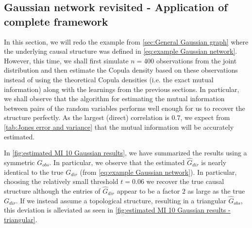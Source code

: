 \documentclass[../Thesis.tex]{subfiles}
\begin{document}



\newpage



\subsection{Gaussian network revisited - Application of complete framework}\label{sec:Gaussian network MI example - computation}
In this section, we will redo the example from \autoref{sec:General Gaussian graph} where the underlying causal structure was defined in \autoref{eq:example Gaussian network}. However, this time, we shall first simulate $n = 400$ observations from the joint distribution and then estimate the Copula density based on these observations instead of using the theoretical Copula densities (i.e. the exact mutual information) along with the learnings from the previous sections. In particular, we shall observe that the algorithm for estimating the mutual information between pairs of the random variables performs well enough for us to recover the structure perfectly. As the largest (direct) correlation is $0.7$, we expect from \autoref{tab:Jones error and variance} that the mutual information will be accurately estimated.







In \autoref{fig:estimated MI 10 Gaussian results}, we have summarized the results using a symmetric $G_{obs}$. In particular, we observe that the estimated $\hat{G}_{dir}$ is nearly identical to the true $G_{dir}$ (from \autoref{eq:example Gaussian network}). In particular, choosing the relatively small threshold $t = 0.06$ we recover the true causal structure although the entries of $\hat{G}_{dir}$ appear to be a factor $2$ as large as the true $G_{dir}$. If we instead assume a topological structure, resulting in a triangular $\hat{G}_{obs}$, this deviation is alleviated as seen in \autoref{fig:estimated MI 10 Gaussian results - triangular}.
\end{document}
